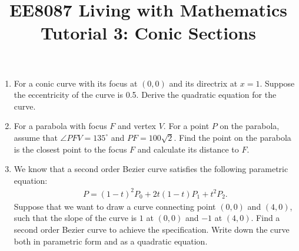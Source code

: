 \documentclass{article}
\title{EE8087 Living with Mathematics\\Tutorial 3: Conic Sections}
\date{}
\begin{document}
 \maketitle
\begin{enumerate}
\item For a conic curve with its focus at $(0,0)$ and its directrix at $x = 1$. Suppose the eccentricity of the curve is 0.5. Derive the quadratic equation for the curve.


\item For a parabola with focus $F$ and vertex $V$. For a point $P$ on the parabola, assume that $\angle PFV = 135^\circ$ and $PF = 100\sqrt{2}$. Find the point on the parabola is the closest point to the focus $F$ and calculate its distance to $F$.
  
\begin{figure}[h]
  \centering
{}
\end{figure}
\item We know that a second order Bezier curve satisfies the following parametric equation:
\begin{align*}
  P = (1-t)^2P_0 + 2t(1-t)P_1 + t^2 P_2.
\end{align*}
Suppose that we want to draw a curve connecting point $(0,0)$ and $(4,0)$, such that the slope of the curve is $1$ at $(0,0)$ and $-1$ at $(4,0)$. Find a second order Bezier curve to achieve the specification. Write down the curve both in parametric form and as a quadratic equation.

\begin{figure}[h]
  \centering
\end{figure}
\end{enumerate}
\end{document}
